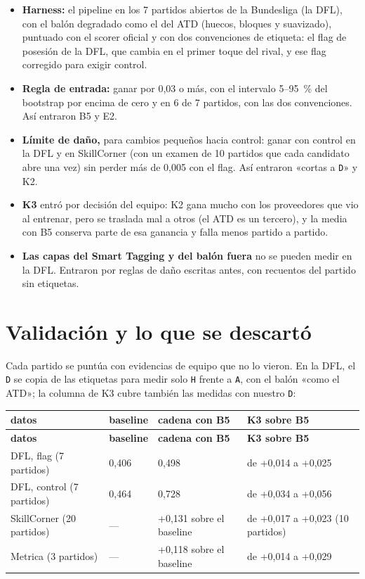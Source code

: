 \documentclass[10pt,a4paper]{article}
\newcommand{\code}[1]{\texttt{\textcolor{codigo}{#1}}}
\begin{document}
\begin{itemize}
  \item \textbf{Harness:} el pipeline en los 7 partidos abiertos de la Bundesliga (la DFL), con el balón degradado como el del ATD (huecos, bloques y suavizado), puntuado con el scorer oficial y con dos convenciones de etiqueta: el flag de posesión de la DFL, que cambia en el primer toque del rival, y ese flag corregido para exigir control.
  \item \textbf{Regla de entrada:} ganar por 0,03 o más, con el intervalo 5–95~\% del bootstrap por encima de cero y en 6 de 7 partidos, con las dos convenciones. Así entraron B5 y E2.
  \item \textbf{Límite de daño,} para cambios pequeños hacia control: ganar con control en la DFL y en SkillCorner (con un examen de 10 partidos que cada candidato abre una vez) sin perder más de 0,005 con el flag. Así entraron «cortas a \code{D}» y K2.
  \item \textbf{K3} entró por decisión del equipo: K2 gana mucho con los proveedores que vio al entrenar, pero se traslada mal a otros (el ATD es un tercero), y la media con B5 conserva parte de esa ganancia y falla menos partido a partido.
  \item \textbf{Las capas del Smart Tagging y del balón fuera} no se pueden medir en la DFL. Entraron por reglas de daño escritas antes, con recuentos del partido sin etiquetas.
\end{itemize}

\section{Validación y lo que se descartó}\label{sec:2}

Cada partido se puntúa con evidencias de equipo que no lo vieron. En la DFL, el \code{D} se copia de las etiquetas para medir solo \code{H} frente a \code{A}, con el balón «como el ATD»; la columna de K3 cubre también las medidas con nuestro \code{D}:

{\small
\begin{xltabular}{\linewidth}{@{}>{\raggedright\arraybackslash{}\hsize}Xll>{\raggedright\arraybackslash{}\hsize}X@{}}
\toprule
\textbf{datos} & \textbf{baseline} & \textbf{cadena con B5} & \textbf{K3 sobre B5} \\
\midrule
\endfirsthead
\toprule
\textbf{datos} & \textbf{baseline} & \textbf{cadena con B5} & \textbf{K3 sobre B5} \\
\midrule
\endhead
\bottomrule
\endlastfoot
DFL, flag (7 partidos) & 0,406 & 0,498 & de +0,014 a +0,025 \\
DFL, control (7 partidos) & 0,464 & 0,728 & de +0,034 a +0,056 \\
SkillCorner (20 partidos) & — & +0,131 sobre el baseline & de +0,017 a +0,023 (10 partidos) \\
Metrica (3 partidos) & — & +0,118 sobre el baseline & de +0,014 a +0,029 \\
\end{xltabular}
}
\end{document}
